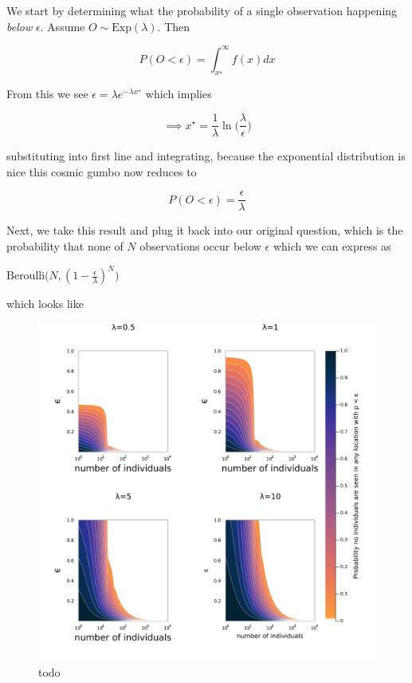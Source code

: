 \documentclass[10pt,oneside]{article}
\makeatletter
\def\maxwidth{\ifdim\Gin@nat@width>\linewidth\linewidth
\else\Gin@nat@width\fi}
\let\Oldincludegraphics\includegraphics
\renewcommand{\includegraphics}[1]{\Oldincludegraphics[width=\maxwidth]{#1}}
\makeatother
\begin{document}
We start by determining what the probability of a single observation
happening \emph{below} \(\epsilon\). Assume
\(O \sim \text{Exp}(\lambda)\). Then

\[P(O < \epsilon) = \int_{x^\star}^\infty f(x) dx\]

From this we see \(\epsilon = \lambda e^{-\lambda x^\star}\) which
implies

\[\implies x^\star = \frac{1}{\lambda}\ln \bigg(\frac{\lambda}{\epsilon} \bigg)\]

substituting into first line and integrating, because the exponential
distribution is nice this cosmic gumbo now reduces to

\[P(O < \epsilon) = \frac{\epsilon}{\lambda}\]

Next, we take this result and plug it back into our original question,
which is the probability that none of \(N\) observations occur below
\(\epsilon\) which we can express as

\(\text{Beroulli}\big(N, (1 - \frac{\epsilon}{\lambda})^N\big)\)

which looks like

\begin{figure}
\hypertarget{fig:neato}{%
\centering
\includegraphics{./figures/neat.png}
\caption{todo}\label{fig:neato}
}
\end{figure}
\end{document}
